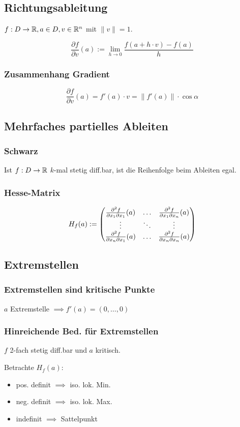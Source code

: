 \subsection*{Richtungsableitung}
$f: D \to \mathbb{R}, a\in D, v\in\mathbb{R}^n$ mit $\|v\|=1$.

\[\frac{\partial f}{\partial v}(a) := \lim_{h\to0}\frac{f(a+h\cdot v) - f(a)}{h}\]

\subsubsection*{Zusammenhang Gradient}
\[\frac{\partial f}{\partial v}(a)=f'(a)\cdot v = \|f'(a)\| \cdot \cos\alpha\]

\subsection*{Mehrfaches partielles Ableiten}

\subsubsection*{Schwarz}
Ist $f:D\to\mathbb{R}$ $k$-mal stetig diff.bar, ist die Reihenfolge beim Ableiten egal.

\subsubsection*{Hesse-Matrix}
\[
	H_f(a) := \begin{pmatrix} 
		\frac{\partial^2 f}{\partial x_1\partial x_1}(a) & \ldots & \frac{\partial^2 f}{\partial x_1 \partial x_n}(a) \\
		\vdots & \ddots & \vdots \\
		\frac{\partial^2 f}{\partial x_n\partial x_1}(a) & \ldots & \frac{\partial^2 f}{\partial x_n \partial x_n}(a)
	 \end{pmatrix}
\]

\subsection*{Extremstellen}

\subsubsection*{Extremstellen sind kritische Punkte}
$a$ Extremstelle $\implies f'(a)=(0,\ldots,0)$

\subsubsection*{Hinreichende Bed. für Extremstellen}
$f$ 2-fach stetig diff.bar und $a$ kritisch.

Betrachte $H_f(a)$:
\begin{itemize}
	\item pos. definit $\implies$ iso. lok. Min.
	\item neg. definit $\implies$ iso. lok. Max.
	\item indefinit $\implies$ Sattelpunkt
\end{itemize}

